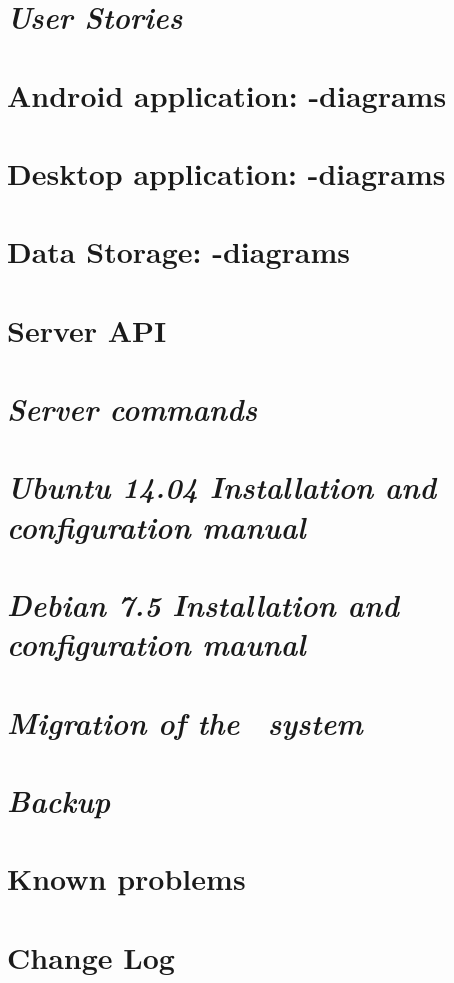 \begin{appendix}

\chapter{\textit{User Stories}}


\chapter{Android application: -diagrams}


\chapter{Desktop application: -diagrams}
\label{chap:des_appendix}


\chapter{Data Storage: -diagrams}
\label{chap:dat_umls}


\chapter{Server API}


\chapter{\textit{Server commands}}


\chapter{\textit{Ubuntu 14.04 Installation and configuration manual}}


\chapter{\textit{Debian 7.5 Installation and configuration maunal}}


\chapter{\textit{Migration of the \appName\ system}}


\chapter{\textit{Backup}}


\chapter{Known problems}
\label{chap:knownProblems}


\chapter{Change Log}


\end{appendix}
